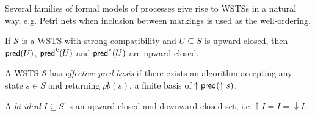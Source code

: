 Several families of formal models of processes give rise to WSTSs in a natural way, e.g. Petri nets when inclusion between markings is used as the well-ordering.


\iffalse
\begin{proposition}\cite{DBLP:journals/tcs/FinkelS01}
If $\mathscr{S}$ is an WSTS and $U \subseteq S$ is an upward-closed set of states, then $\pred^*(U )$ is upward-
closed.
\end{proposition}
%
Proof. Assume $s \in \pred^* (U )$. Then $s \rightarrow^* t$ for some $t \in U $. If now $s' \geq s$ then upward-compatibility entails that $s' \rightarrow^* t'$ for some $t' \geq t$. Then $t' \in U$ and $s' \in \pred^*(U )$.
\fi

\begin{proposition}\cite{DBLP:journals/tcs/FinkelS01}
If $\mathscr{S}$ is a WSTS with strong compatibility and $U \subseteq S$ is upward-closed, then $\textsf{pred}(U )$, $\textsf{pred}^k(U )$ and $\pred^*(U )$ are upward-closed.
\end{proposition}
\iffalse
Proof. Assume $s \in \pred (I )$. Then $s \rightarrow t$ for some $t \in I $. If now $s' \geq s$ then strong upward-compatibility entails that $s' \rightarrow t'$ for some $t' \geq t$. Then $t' \in I$ and $s' \in \pred(I )$.
\fi
{}



\begin{definition}\cite{DBLP:journals/iandc/AbdullaCJT00}
A WSTS $\mathscr{S}$ has {\em effective pred-basis} if there exists an algorithm accepting
any state $s \in S$ and returning $pb(s)$, a finite basis of $\uparrow \textsf{pred}(\uparrow s)$.
\end{definition}



\iffalse
\begin{definition}
A {\em bi-ideal} $I \subseteq S$ is an upward-closed and downward-closed set, i.e
$\uparrow I = I = \downarrow I$.
\end{definition}


